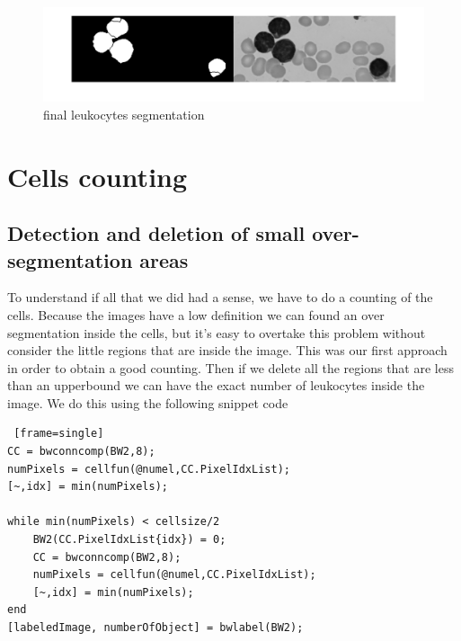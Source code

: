 \begin{figure}
	\begin{center}
		\centering
		\includegraphics[scale=0.3]{img/segmentation.png}
		\caption{final leukocytes segmentation }
		\label{fig:bwarea}
	\end{center}
\end{figure}

\section{Cells counting}
\subsection{Detection and deletion of small over-segmentation areas}
To understand if all that we did had a sense, we have to do a counting of the cells. Because the images have a low definition we can found an over segmentation inside the cells, but it's easy to overtake this problem without consider the little regions that are inside the image. This was our first approach in order to obtain a good counting. Then if we delete all the regions that are less than an upperbound we can have the exact number of leukocytes inside the image. We do this using the following snippet code
\bigskip
\begin{minipage}{\linewidth}
\begin{lstlisting} [frame=single]
CC = bwconncomp(BW2,8);
numPixels = cellfun(@numel,CC.PixelIdxList);
[~,idx] = min(numPixels);

while min(numPixels) < cellsize/2
    BW2(CC.PixelIdxList{idx}) = 0;
    CC = bwconncomp(BW2,8);
    numPixels = cellfun(@numel,CC.PixelIdxList);
    [~,idx] = min(numPixels);
end
[labeledImage, numberOfObject] = bwlabel(BW2);
\end{lstlisting}
\end{minipage}
\bigskip

